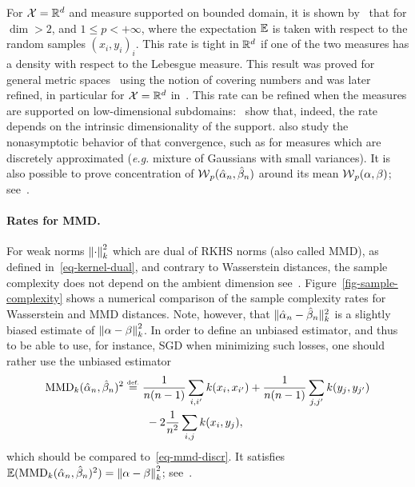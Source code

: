 For $\mathcal{X}=\mathbb{R}^d$ and measure supported on bounded domain, it is shown by~\citep{dudley1969speed} that for $\dim>2$, and $1 \leq p < +\infty$,  
where the expectation $\mathbb{E}$ is taken with respect to the random samples $(x_i,y_i)_i$. This rate is tight in $\mathbb{R}^d$ if one of the two measures has a density with respect to the Lebesgue measure. This result was proved for general metric spaces~\citep{dudley1969speed} using the notion of covering numbers and was later refined, in particular for $\mathcal{X}=\mathbb{R}^d$ in~\citep{dereich2013constructive,fournier2015rate}. 
This rate can be refined when the measures are supported on low-dimensional subdomains:~\citet{weed2017sharp} show that, indeed, the rate depends on the intrinsic dimensionality of the support. \citeauthor{weed2017sharp} also study the nonasymptotic behavior of that convergence, such as for measures which are discretely approximated (\emph{e.g.} mixture of Gaussians with small variances).
%
It is also possible to prove concentration of $\operatorname{\mathcal{W}}_p(\hat {\alpha}_n,\hat {\beta}_n)$ around its mean $\operatorname{\mathcal{W}}_p(\alpha,\beta)$; see~\citep{bolley2007quantitative,boissard2011simple,weed2017sharp}.

\paragraph{Rates for MMD.}

For weak norms $\left\| \cdot \right\|^2_{k}$ which are dual of RKHS norms (also called MMD), as defined in~\eqref{eq-kernel-dual}, and contrary to Wasserstein distances, the sample complexity does not depend on the ambient dimension 
see~\citep{sriperumbudur2012empirical}. 
%
Figure~\ref{fig-sample-complexity} shows a numerical comparison of the sample complexity rates for Wasserstein and MMD distances.  
%
Note, however, that $\| \hat {\alpha}_n-\hat {\beta}_n \|_{k}^2$ is a slightly biased estimate of $\left\| \alpha-\beta \right\|_{k}^2$. In order to define an unbiased estimator, and thus to be able to use, for instance, SGD when minimizing such losses, one should rather use the unbiased estimator 
\begin{align*}
	\text{MMD}_{\Krkhs}(\hat \al_n,\hat \be_n)^2 & \eqdef
		\frac{1}{n(n-1)} \sum_{i,i'} \Krkhs(x_i,x_{i'})	+
		\frac{1}{n(n-1)}\sum_{j,j'} \Krkhs(y_j,y_{j'}) \\
		 & \qquad - 2
		\frac{1}{n^2}\sum_{i,j} \Krkhs(x_i,y_j), 
\end{align*}
which should be compared to~\eqref{eq-mmd-discr}. It satisfies $\mathbb{E}(\text{MMD}_{k}(\hat {\alpha}_n,\hat {\beta}_n)^2) = \left\| \alpha-\beta \right\|_{k}^2$; see~\citep{gretton2012kernel}.


